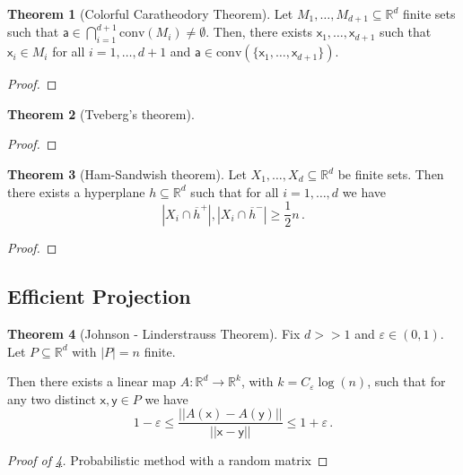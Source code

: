 \documentclass[12pt]{amsart}
\theoremstyle{definition}
\newtheorem{thm}{Theorem}[section]
\newcommand{\R}{\mathbb{R}}
\newcommand{\vx}{\mathsf{x}}
\newcommand{\vy}{\mathsf{y}}
\newcommand{\va}{\mathsf{a}}
\newcommand{\conv}{\mathrm{conv}}
\begin{document}
\begin{thm}[Colorful Caratheodory Theorem]
Let $M_1, \ldots, M_{d+1} \subseteq \R^d$ finite sets such that $\va \in \bigcap_{i = 1}^{d+1} \conv (M_i) \neq \emptyset$.
Then, there exists $\vx_1, \dots, \vx_{d+1}$ such that $\vx_i \in M_i$ for all $i = 1, \ldots, d+1$ and $\va \in \conv (\{\vx_1, \ldots, \vx_{d+1}\})$.
\end{thm}

\begin{proof}

\end{proof}


\begin{thm}[Tveberg's theorem]

\end{thm}


\begin{proof}

\end{proof}



\begin{thm}[Ham-Sandwish theorem]
Let $X_1 ,  \ldots , X_d \subseteq  \R^d$ be finite sets.
Then there exists a hyperplane $h \subseteq \R^d$ such that for all $i=1, \ldots, d$ we have 
$$ |X_i \cap \overline{h}^+| , |X_i \cap \overline{h}^-| \geq \frac{1}{2} n\, . $$
\end{thm}

\begin{proof}

\end{proof}



\subsection{Efficient Projection}




\begin{thm}[Johnson - Linderstrauss Theorem]\label{thm:JL}
Fix $d >> 1$ and $\varepsilon \in (0, 1)$.
Let $P \subseteq \R^d$ with $|P| = n$ finite.

Then there exists a linear map $A:\R^d \to \R^k$, with $k = C_{\varepsilon} \log (n)$, such that for any two distinct $\vx, \vy \in P$ we have
$$ 1 - \varepsilon \leq \frac{||A(\vx) - A(\vy)||}{||\vx - \vy||} \leq 1 + \varepsilon \, . $$
\end{thm}

\begin{proof}[Proof of \cref{thm:JL}]%
Probabilistic method with a random matrix
\end{proof}
\end{document}
